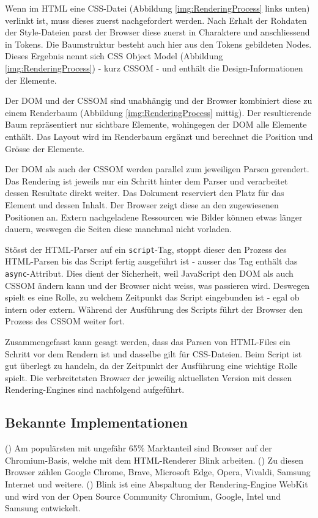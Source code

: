 Wenn im HTML eine CSS-Datei (Abbildung \ref{img:RenderingProcess} links unten) verlinkt ist, muss dieses zuerst nachgefordert werden.
Nach Erhalt der Rohdaten der Style-Dateien parst der Browser diese zuerst in Charaktere und anschliessend in Tokens.
Die Baumstruktur besteht auch hier aus den Tokens gebildeten Nodes. 
Dieses Ergebnis nennt sich CSS Object Model (Abbildung \ref{img:RenderingProcess}) - kurz CSSOM - und enthält die Design-Informationen der Elemente.

Der DOM und der CSSOM sind unabhängig und der Browser kombiniert diese zu einem Renderbaum (Abbildung \ref{img:RenderingProcess} mittig).
Der resultierende Baum repräsentiert nur sichtbare Elemente, wohingegen der DOM alle Elemente enthält.
Das Layout wird im Renderbaum ergänzt und berechnet die Position und Grösse der Elemente.

Der DOM als auch der CSSOM werden parallel zum jeweiligen Parsen gerendert.
Das Rendering ist jeweils nur ein Schritt hinter dem Parser und verarbeitet dessen Resultate direkt weiter.
Das Dokument reserviert den Platz für das Element und dessen Inhalt.
Der Browser zeigt diese an den zugewiesenen Positionen an.
Extern nachgeladene Ressourcen wie Bilder können etwas länger dauern, weswegen die Seiten diese manchmal nicht vorladen.

Stösst der HTML-Parser auf ein \texttt{script}-Tag, stoppt dieser den Prozess des HTML-Parsen bis das Script fertig ausgeführt ist - ausser das Tag enthält das \texttt{async}-Attribut.
Dies dient der Sicherheit, weil JavaScript den DOM als auch CSSOM ändern kann und der Browser nicht weiss, was passieren wird.
Deswegen spielt es eine Rolle, zu welchem Zeitpunkt das Script eingebunden ist - egal ob intern oder extern. 
Während der Ausführung des Scripts führt der Browser den Prozess des CSSOM weiter fort.

Zusammengefasst kann gesagt werden, dass das Parsen von HTML-Files ein Schritt vor dem Rendern ist und dasselbe gilt für CSS-Dateien. 
Beim Script ist gut überlegt zu handeln, da der Zeitpunkt der Ausführung eine wichtige Rolle spielt.
Die verbreitetsten Browser der jeweilig aktuellsten Version mit dessen Rendering-Engines sind nachfolgend aufgeführt.


\subsection{Bekannte Implementationen}
\label{sec:implementationsRenderer}

(\cite{blinkRenderer}) Am populärsten mit ungefähr 65\% Marktanteil sind Browser auf der Chromium-Basis, welche mit dem HTML-Renderer Blink arbeiten. 
(\cite{chromiumBrowser}) Zu diesen Browser zählen Google Chrome, Brave, Microsoft Edge, Opera, Vivaldi, Samsung Internet und weitere.
(\cite{blinkRenderer}) Blink ist eine Abspaltung der Rendering-Engine WebKit und wird von der Open Source Community Chromium, Google, Intel und Samsung entwickelt.

